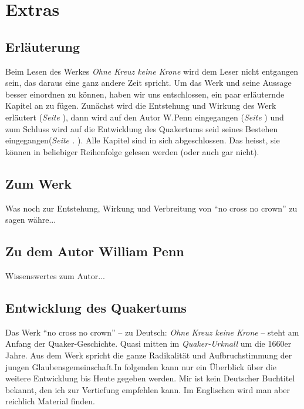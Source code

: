 
\part{Extras}
\chapter{Erläuterung}

Beim Lesen des Werkes \textit{Ohne Kreuz keine Krone} wird dem Leser nicht
entgangen sein, das daraus eine ganz andere Zeit spricht. Um das Werk und seine
Aussage besser einordnen zu können, haben wir uns entschlossen, ein paar
erläuternde Kapitel an zu fügen. Zunächst wird die Entstehung und Wirkung des
Werk erläutert (\textit{Seite \pageref{ref:zum_werk}}), dann wird auf den Autor
W.Penn eingegangen (\textit{Seite \pageref{ref:zum_autor_penn}}) und zum Schluss
wird auf die Entwicklung des Quakertums seid seines Bestehen
eingegangen(\textit{Seite . \pageref{ref:entwiklung_quakertum}}). Alle Kapitel
sind in sich abgeschlossen. Das heisst, sie können in beliebiger Reihenfolge
gelesen werden (oder auch gar nicht).

\chapter{Zum Werk}\label{ref:zum_werk}

Was noch zur Entstehung, Wirkung und Verbreitung von "`no cross no crown"' zu
sagen währe...

\chapter{Zu dem Autor William Penn}\label{ref:zum_autor_penn}

Wissenswertes zum Autor...

\chapter{Entwicklung des Quakertums}\label{ref:entwiklung_quakertum}


Das Werk "`no cross no crown"' -- zu Deutsch: \textit{Ohne Kreuz keine Krone} --
steht am Anfang der Quaker-Geschichte. Quasi mitten im \textit{Quaker-Urknall}
um die 1660er Jahre. Aus dem Werk spricht die ganze Radikalität und
Aufbruchstimmung der jungen Glaubensgemeinschaft.In folgenden kann nur ein
Überblick über die weitere Entwicklung bis Heute gegeben werden. Mir ist kein
Deutscher Buchtitel bekannt, den ich zur Vertiefung empfehlen kann. Im
Englischen wird man aber reichlich Material finden.

